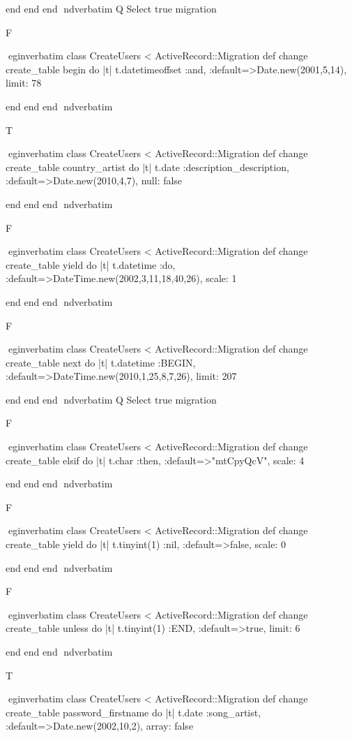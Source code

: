     end 
  end 
end
nd{verbatim}
Q
 Select true migration

F

egin{verbatim}
 class CreateUsers < ActiveRecord::Migration 
  def change 
    create_table begin do |t| 
      t.datetimeoffset :and, :default=>Date.new(2001,5,14), limit: 78
    
    end 
  end 
end
nd{verbatim}

T

egin{verbatim}
 class CreateUsers < ActiveRecord::Migration 
  def change 
    create_table country_artist do |t| 
      t.date :description_description, :default=>Date.new(2010,4,7), null: false
    
    end 
  end 
end
nd{verbatim}

F

egin{verbatim}
 class CreateUsers < ActiveRecord::Migration 
  def change 
    create_table yield do |t| 
      t.datetime :do, :default=>DateTime.new(2002,3,11,18,40,26), scale: 1
    
    end 
  end 
end
nd{verbatim}

F

egin{verbatim}
 class CreateUsers < ActiveRecord::Migration 
  def change 
    create_table next do |t| 
      t.datetime :BEGIN, :default=>DateTime.new(2010,1,25,8,7,26), limit: 207
    
    end 
  end 
end
nd{verbatim}
Q
 Select true migration

F

egin{verbatim}
 class CreateUsers < ActiveRecord::Migration 
  def change 
    create_table elsif do |t| 
      t.char :then, :default=>"mtCpyQcV", scale: 4
    
    end 
  end 
end
nd{verbatim}

F

egin{verbatim}
 class CreateUsers < ActiveRecord::Migration 
  def change 
    create_table yield do |t| 
      t.tinyint(1) :nil, :default=>false, scale: 0
    
    end 
  end 
end
nd{verbatim}

F

egin{verbatim}
 class CreateUsers < ActiveRecord::Migration 
  def change 
    create_table unless do |t| 
      t.tinyint(1) :END, :default=>true, limit: 6
    
    end 
  end 
end
nd{verbatim}

T

egin{verbatim}
 class CreateUsers < ActiveRecord::Migration 
  def change 
    create_table password_firstname do |t| 
      t.date :song_artist, :default=>Date.new(2002,10,2), array: false
    
